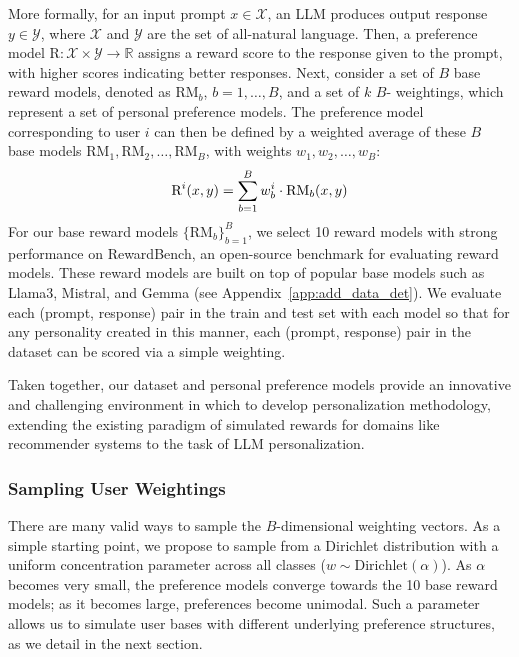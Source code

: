 More formally, for an input prompt $x \in \mathcal{X}$, an LLM produces output response $y \in \mathcal{Y}$, where $\mathcal{X}$ and $\mathcal{Y}$ are the set of all-natural language.  Then, a preference model $\text{R}: \mathcal{X} \times \mathcal{Y} \rightarrow \mathbb{R}$ assigns a reward score to the response given to the prompt, with higher scores indicating better responses.  
Next, consider a set of $B$ base reward models, denoted as $\text{RM}_b$, $b=1,\dots,B$, and a set of $k$ $B$- weightings, which represent a set of personal preference models.  
The preference model corresponding to user $i$ can then be defined by a weighted average of these $B$ base models $\text{RM}_1, \text{RM}_2,\dots, \text{RM}_{B}$, with weights $w_1, w_2,\dots, w_B$:
\begin{align}
\vspace{-3pt}
    \text{R}^i(x,y) = \sum_{b=1}^{B} w^i_{b}\cdot\text{RM}_b(x,y)
\vspace{-3pt}
\end{align}
For our base reward models $\{\text{RM}_b\}_{b=1}^B$, we select 10 reward models with strong performance on RewardBench, an open-source benchmark for evaluating reward models.  
These reward models are built on top of popular base models such as Llama3, Mistral, and Gemma (see Appendix~\ref{app:add_data_det}).  
We evaluate each (prompt, response) pair in the train and test set with each model so that for any personality created in this manner, each (prompt, response) pair in the dataset can be scored via a simple weighting.

Taken together, our dataset and personal preference models provide an innovative and challenging environment in which to develop personalization methodology, extending the existing paradigm of simulated rewards for domains like recommender systems \citep{zhao2023kuaisimcomprehensivesimulatorrecommender, ie2019recsimconfigurablesimulationplatform} to the task of LLM personalization.

\subsubsection{Sampling User Weightings}
There are many valid ways to sample the $B$-dimensional weighting vectors.  As a simple starting point, we propose to sample from a Dirichlet distribution with a uniform concentration parameter across all classes ($w \sim \text{Dirichlet}(\alpha)$).  
As $\alpha$ becomes very small, the preference models converge towards the 10 base reward models; as it becomes large, preferences become unimodal.  Such a parameter allows us to simulate user bases with different underlying preference structures, as we detail in the next section.



